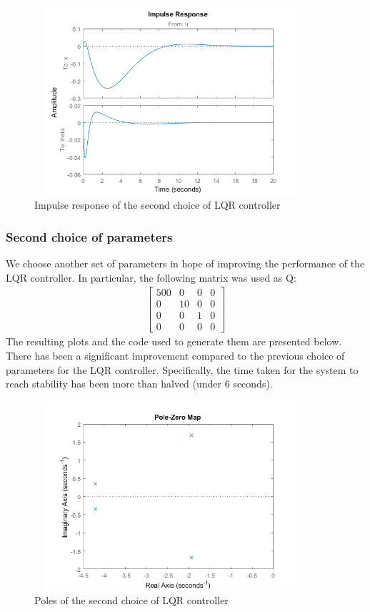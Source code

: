 \documentclass [12pt,letterpaper]{exam}
\begin{document}
\begin{figure}[H]
  \centering
    \includegraphics[width=10.15cm, height=7cm]{lqr_impulse} 
  \caption{Impulse response of the second choice of LQR controller}
  \label{fig:lqr_impulse}
\end{figure}



\subsubsection{Second choice of parameters}
We choose another set of parameters in hope of improving the performance of the LQR controller. In particular, the following matrix was used as Q:
\begin{align}
\begin{bmatrix}
500 & 0 & 0 & 0 \\
0 & 10 & 0 & 0 \\
0 & 0 & 1 & 0 \\
0 & 0 & 0 & 0
\end{bmatrix}
\end{align}
The resulting plots and the code used to generate them are presented below. There has been a significant improvement compared to the previous choice of parameters for the LQR controller. Specifically, the time taken for the system to reach stability has been more than halved (under 6 seconds).

\begin{figure}[H]
  \centering
    \includegraphics[width=10.15cm, height=7cm]{lqr2_poles} 
  \caption{Poles of the second choice of LQR controller}
  \label{fig:lqr2_poles}
\end{figure}
\end{document}
